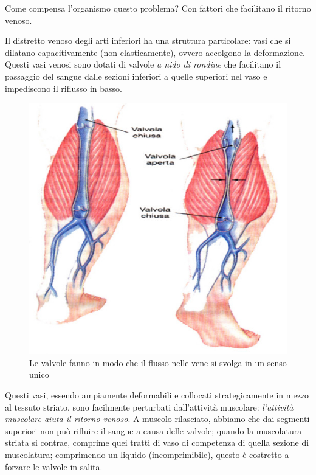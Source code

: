 \documentclass[a4paper,12pt]{article}
\begin{document}
Come compensa l'organismo questo problema? Con fattori che facilitano il ritorno venoso.

Il distretto venoso degli arti inferiori ha una struttura particolare: vasi che si dilatano capacitivamente (non elasticamente), ovvero accolgono la deformazione. Questi vasi venosi sono dotati di valvole \emph{a nido di rondine} che facilitano il passaggio del sangue dalle sezioni inferiori a quelle superiori nel vaso e impediscono il riflusso in basso. 
\begin{figure}[H]
\centering
\includegraphics[scale=0.35]{immagine/nido.jpg}
\caption{Le valvole fanno in modo che il flusso nelle vene si svolga in un senso unico}
\end{figure}

Questi vasi, essendo ampiamente deformabili e collocati strategicamente in mezzo al tessuto striato, sono facilmente perturbati dall'attività muscolare: \emph{l'attività muscolare aiuta il ritorno venoso}. A muscolo rilasciato, abbiamo che dai segmenti superiori non può rifluire il sangue a causa delle valvole; quando la muscolatura striata si contrae, comprime quei tratti di vaso di competenza di quella sezione di muscolatura; comprimendo un liquido (incomprimibile), questo è costretto a forzare le valvole in salita. 
\end{document}
